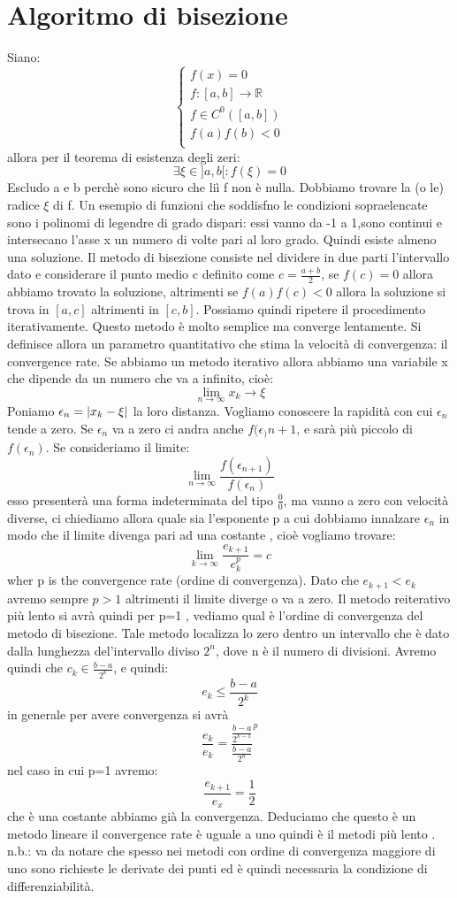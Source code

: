 \section{Algoritmo di bisezione}
Siano:
\[\begin{cases}
   f(x)=0\\
   f:[a,b]\rightarrow \mathbb{R}\\
   f\in C^0([a,b])\\
   f(a)f(b)<0\\
\end{cases}\]
allora per il teorema di esistenza degli zeri:
$$\exists \xi \in ]a,b[ :f(\xi)=0$$
Escludo a e b perchè sono sicuro che liì f non è nulla. Dobbiamo trovare la (o le) radice $\xi$ di f.
Un esempio di funzioni che soddisfno le condizioni sopraelencate sono i polinomi di legendre di grado dispari: essi vanno da -1 a 1,sono continui e intersecano l'asse x un numero di volte pari al loro grado. Quindi esiste almeno una soluzione. Il metodo di bisezione consiste nel dividere in due parti l'intervallo dato e considerare il punto medio c definito come $c=\frac{a+b}{2}$, se $f(c)=0$ allora abbiamo trovato la soluzione, altrimenti se $f(a)f(c)<0$ allora la soluzione si trova in $[a,c]$ altrimenti in $[c,b]$. Possiamo quindi ripetere il procedimento iterativamente. Questo metodo è molto semplice ma converge lentamente. Si definisce allora un parametro quantitativo che stima la velocità di convergenza: il convergence rate. Se abbiamo un metodo iterativo allora abbiamo una variabile x che dipende da un numero che va a infinito, cioè:
\[\lim_{n \rightarrow \infty}x_k \rightarrow \xi \]
Poniamo $\epsilon_n = \absolutevalue{x_k-\xi}$ la loro distanza. Vogliamo conoscere la rapidità con cui $\epsilon_n$ tende a zero. Se $\epsilon_n$ va a zero ci andra anche $f(\epsilon_){n+1}$, e sarà più piccolo di $f(\epsilon_n)$. Se consideriamo il limite: 
\[ \lim_{n \rightarrow \infty}\frac{f(\epsilon_{n+1})}{f(\epsilon_n)}\] esso presenterà una forma indeterminata del tipo $\frac{0}{0}$, ma vanno a zero con velocità diverse,
ci chiediamo allora quale sia l'esponente p a cui dobbiamo innalzare $\epsilon_n$ in modo che il limite divenga pari ad una costante , cioè vogliamo trovare:
\[\lim_{k\rightarrow \infty}\frac{e_{k+1}}{e_k^p}=c\] wher p is the convergence rate (ordine di convergenza).
Dato che $e_{k+1}<e_k$ avremo sempre  $p > 1$ altrimenti il limite diverge o va a zero. Il metodo reiterativo più lento si avrà quindi per p=1 , vediamo qual è l'ordine di convergenza del metodo di bisezione. Tale metodo localizza lo zero dentro un intervallo che è dato dalla lunghezza del'intervallo diviso $2^n$, dove n è il numero di divisioni. Avremo quindi che $c_k \in \frac{b-a}{2^k}$, e quindi:
\[e_{k}\le \frac{b-a}{2^k}\]
in generale per avere convergenza si avrà
\[\frac{e_{k}}{e_k}= \frac{\frac{b-a}{2^{k-1}}}{\frac{b-a}{2^n}}^p\]
nel caso in cui p=1 avremo:
\[\frac{e_{k+1}}{e_x}=\frac{1}{2}\]
che è una costante abbiamo già la convergenza. Deduciamo che questo è un metodo lineare il convergence rate è uguale a uno quindi è il metodi più lento . n.b.: va da notare che spesso nei metodi con ordine di convergenza maggiore di uno sono richieste le derivate dei punti ed è quindi necessaria la condizione di differenziabilità.

